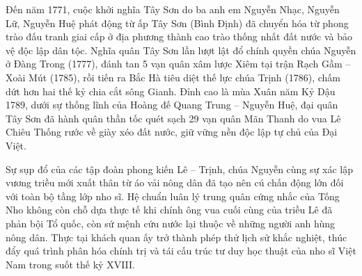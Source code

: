 Đến năm 1771, cuộc khởi nghĩa Tây Sơn do ba anh em Nguyễn Nhạc, Nguyễn Lữ, Nguyễn Huệ phát động từ ấp Tây Sơn (Bình Định) đã chuyển hóa từ phong trào đấu tranh giai cấp ở địa phương thành cao trào thống nhất đất nước và bảo vệ độc lập dân tộc. Nghĩa quân Tây Sơn lần lượt lật đổ chính quyền chúa Nguyễn ở Đàng Trong (1777), đánh tan 5 vạn quân xâm lược Xiêm tại trận Rạch Gầm -- Xoài Mút (1785), rồi tiến ra Bắc Hà tiêu diệt thế lực chúa Trịnh (1786), chấm dứt hơn hai thế kỷ chia cắt sông Gianh. Đỉnh cao là mùa Xuân năm Kỷ Dậu 1789, dưới sự thống lĩnh của Hoàng đế Quang Trung -- Nguyễn Huệ, đại quân Tây Sơn đã hành quân thần tốc quét sạch 29 vạn quân Mãn Thanh do vua Lê Chiêu Thống rước về giày xéo đất nước, giữ vững nền độc lập tự chủ của Đại Việt.

Sự sụp đổ của các tập đoàn phong kiến Lê -- Trịnh, chúa Nguyễn cùng sự xác lập vương triều mới xuất thân từ áo vải nông dân đã tạo nên cú chấn động lớn đối với toàn bộ tầng lớp nho sĩ. Hệ chuẩn luân lý trung quân cứng nhắc của Tống Nho không còn chỗ dựa thực tế khi chính ông vua cuối cùng của triều Lê đã phản bội Tổ quốc, còn sứ mệnh cứu nước lại thuộc về những người anh hùng nông dân. Thực tại khách quan ấy trở thành phép thử lịch sử khắc nghiệt, thúc đẩy quá trình phân hóa chính trị và tái cấu trúc tư duy học thuật của nho sĩ Việt Nam trong suốt thế kỷ XVIII.
